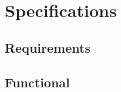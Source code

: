 \documentclass{article}
\begin{document}
	\section{Specifications}
	\label{sec:specs}
	\paragraph{}
	
	\lipsum[1-2]
	
	\subsection{Requirements}
	\label{subsec:reqs}
	\paragraph{}
	
	\lipsum[1-2]
	
	\subsection{Functional}
	\label{subsec:func}
	\paragraph{}
	
	\lipsum[1-2]
\end{document}
